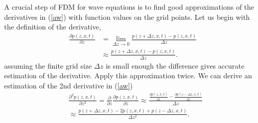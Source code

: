 \documentclass[11pt]{article}
\theoremstyle{plain}
\theoremstyle{definition}
\theoremstyle{remark}
\numberwithin{equation}{section}
\begin{document}
A crucial step of FDM for wave equations is to find good approximations of the derivatives in (\ref{aw}) with function values on the grid points. Let us begin with the definition of the derivative, 
 \begin{equation}
  \begin{aligned}
  \frac{\partial p(z, x, t)}{\partial z} &= \lim\limits_{\Delta z \rightarrow 0} \frac{p(z+\Delta z, x, t) - p(z, x, t)}{\Delta z}\\
  &\approx \frac{p(z+\Delta z, x, t) - p(z, x, t)}{\Delta z}.
  \end{aligned}
  \end{equation}
 assuming the finite grid size $\Delta z$ is small enough the difference gives accurate estimation of the derivative.
  Apply this approximation twice. We can derive an estimation of the 2nd derivative in (\ref{aw})
  \begin{equation}
  \begin{aligned}
  &\frac{\partial^2 p(z, x, t)}{\partial z^2} = \frac{\partial}{\partial z}\frac{\partial p(z, x, t)}{\partial z} \approx \frac{\frac{\partial p(z, x, t)}{\partial z} - \frac{\partial p(z-\Delta z, x, t)}{\partial z}}{\Delta z}\\
  &\approx \frac{p(z+\Delta z, x, t) - 2p(z, x, t) + p(z-\Delta z, x, t)}{\Delta z^2}.
  \end{aligned}
  \end{equation}
  
\end{document}
